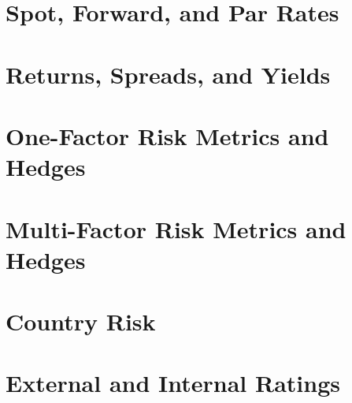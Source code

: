 \documentclass[11pt,fleqn]{book} %
\numberwithin{equation}{section} %
\numberwithin{figure}{section} %
\numberwithin{table}{section} %
\begin{document}
\chapter{Spot, Forward, and Par Rates}

\chapter{Returns, Spreads, and Yields}

\chapter{One-Factor Risk Metrics and Hedges}

\chapter{Multi-Factor Risk Metrics and Hedges}

\chapter{Country Risk}

\chapter{External and Internal Ratings}

\end{document}
